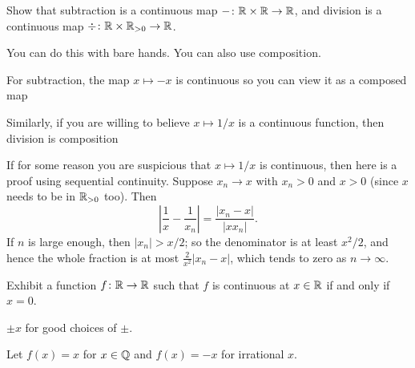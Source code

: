 \begin{problem}
	\label{prob:subtract_divide}
	Show that subtraction is a continuous map $- \colon \mathbb R \times \mathbb R \to \mathbb R$,
	and division is a continuous map $\div \colon \mathbb R \times \mathbb R_{>0} \to \mathbb R$.
	\begin{hint}
		You can do this with bare hands.
		You can also use composition.
	\end{hint}
	\begin{sol}
		For subtraction, the map $x \mapsto -x$ is continuous
		so you can view it as a composed map
		\begin{center}
		\end{center}
		Similarly, if you are willing to believe $x \mapsto 1/x$
		is a continuous function, then division is composition
		\begin{center}
		\end{center}
		If for some reason you are suspicious that $x \mapsto 1/x$ is continuous,
		then here is a proof using sequential continuity.
		Suppose $x_n \to x$ with $x_n > 0$ and $x > 0$
		(since $x$ needs to be in $\mathbb R_{>0}$ too).
		Then \[ \left\lvert \frac{1}{x} - \frac 1{x_n} \right\rvert
			= \frac{\left\lvert x_n-x \right\rvert}{\left\lvert x x_n \right\rvert}.
		\]
		If $n$ is large enough, then $\left\lvert x_n \right\rvert > x/2$;
		so the denominator is at least $x^2/2$,
		and hence the whole fraction is at most
		$\frac{2}{x^2} \left\lvert x_n-x \right\rvert$,
		which tends to zero as $n \to \infty$.
	\end{sol}
\end{problem}

\begin{problem}
	Exhibit a function $f \colon \mathbb R \to \mathbb R$ such that
	$f$ is continuous at $x \in \mathbb R$ if and only if $x=0$.
	\begin{hint}
		$\pm x$ for good choices of $\pm$.
	\end{hint}
	\begin{sol}
		Let $f(x) = x$ for $x \in \mathbb Q$ and $f(x) = -x$ for irrational $x$.
	\end{sol}
\end{problem}

